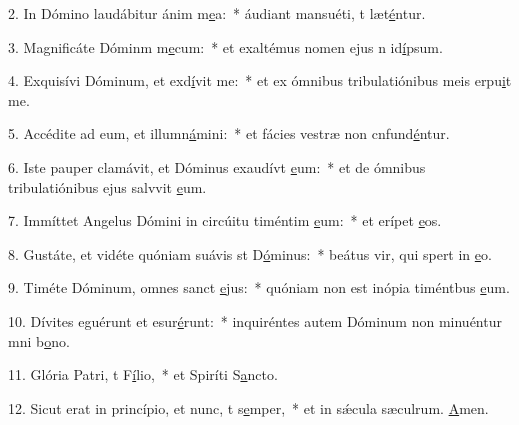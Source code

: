 2. In Dómino laudábitur ánim m\uline{e}a:~* áudiant mansuéti, t læt\uline{é}ntur.\par 
3. Magnificáte Dóminm m\uline{e}cum:~* et exaltémus nomen ejus n id\uline{í}psum.\par 
4. Exquisívi Dóminum, et exd\uline{í}vit me:~* et ex ómnibus tribulatiónibus meis erpu\uline{i}t me.\par 
5. Accédite ad eum, et illumn\uline{á}mini:~* et fácies vestræ non cnfund\uline{é}ntur.\par 
6. Iste pauper clamávit, et Dóminus exaudívt \uline{e}um:~* et de ómnibus tribulatiónibus ejus salvvit \uline{e}um.\par 
7. Immíttet Angelus Dómini in circúitu timéntim \uline{e}um:~* et erípet \uline{e}os.\par 
8. Gustáte, et vidéte quóniam suávis st D\uline{ó}minus:~* beátus vir, qui spert in \uline{e}o.\par 
9. Timéte Dóminum, omnes sanct \uline{e}jus:~* quóniam non est inópia timéntbus \uline{e}um.\par 
10. Dívites eguérunt et esur\uline{é}runt:~* inquiréntes autem Dóminum non minuéntur mni b\uline{o}no.\par 
11. Glória Patri, t F\uline{í}lio,~* et Spiríti S\uline{a}ncto.\par 
12. Sicut erat in princípio, et nunc, t s\uline{e}mper,~* et in sǽcula sæculrum. \uline{A}men.\par 
